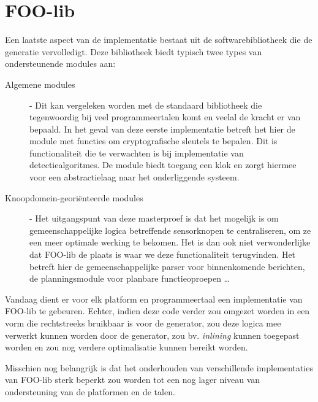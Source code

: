 
\section{FOO-lib}
\label{section:devel-foo-lib}

Een laatste aspect van de implementatie bestaat uit de softwarebibliotheek die
de generatie vervolledigt. Deze bibliotheek biedt typisch twee types van
ondersteunende modules aan:

\begin{description}

\item[Algemene modules] - Dit kan vergeleken worden met de standaard
bibliotheek die tegenwoordig bij veel programmeertalen komt en veelal de kracht
er van bepaald. In het geval van deze eerste implementatie betreft het hier de
 module met functies om cryptografische sleutels te bepalen. Dit is
functionaliteit die te verwachten is bij implementatie van detectiealgoritmes.
De  module biedt toegang een klok en zorgt hiermee voor een
abstractielaag naar het onderliggende systeem.

\item[Knoopdomein-geori\"enteerde modules] - Het uitgangspunt van deze
masterproef is dat het mogelijk is om gemeenschappelijke logica betreffende
sensorknopen te centraliseren, om ze een meer optimale werking te bekomen. Het
is dan ook niet verwonderlijke dat FOO-lib de plaats is waar we deze
functionaliteit terugvinden. Het betreft hier de gemeenschappelijke parser voor
binnenkomende berichten, de planningsmodule voor planbare functieoproepen \dots

\end{description}

Vandaag dient er voor elk platform en programmeertaal een implementatie van
FOO-lib te gebeuren. Echter, indien deze code verder zou omgezet worden in een
vorm die rechtstreeks bruikbaar is voor de generator, zou deze logica mee
verwerkt kunnen worden door de generator, zou bv. \emph{inlining} kunnen
toegepast worden en zou nog verdere optimalisatie kunnen bereikt worden.

Misschien nog belangrijk is dat het onderhouden van verschillende
implementaties van FOO-lib sterk beperkt zou worden tot een nog lager niveau
van ondersteuning van de platformen en de talen.
